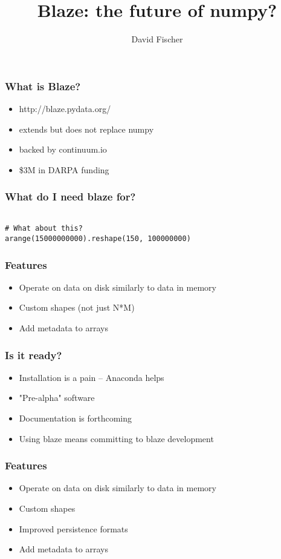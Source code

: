 \documentclass{beamer}
\title[Blaze]{Blaze: the future of numpy?}
\author{David Fischer}
\begin{document}
\begin{frame}
\titlepage
\end{frame}

\begin{frame}
\frametitle{What is Blaze?}
\begin{itemize}
\item http://blaze.pydata.org/
\item extends but does not replace numpy
\item backed by continuum.io
\item \$3M in DARPA funding
\end{itemize}
\end{frame}


\begin{frame}[fragile] %
\frametitle{What do I need blaze for?}
\begin{verbatim}

# What about this?
arange(15000000000).reshape(150, 100000000)

\end{verbatim} 
\end{frame}


\begin{frame}
\frametitle{Features}
\begin{itemize}
\item Operate on data on disk similarly to data in memory
\item Custom shapes (not just N*M)
\item Add metadata to arrays
\end{itemize}
\end{frame}
 
 
\begin{frame}
\frametitle{Is it ready?}
\begin{itemize}
\item Installation is a pain -- Anaconda helps
\item "Pre-alpha" software
\item Documentation is forthcoming
\item Using blaze means committing to blaze development   %
\end{itemize}
\end{frame}


\begin{frame}
\frametitle{Features}
\begin{itemize}
\item Operate on data on disk similarly to data in memory
\item Custom shapes
\item Improved persistence formats   %
\item Add metadata to arrays
\end{itemize}
\end{frame}


\end{document}
